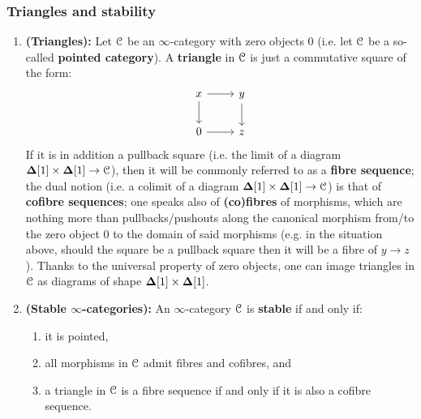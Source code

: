         \subsubsection{Triangles and stability}
            \begin{definition} \label{def: stable_infinity_categories} 
                \noindent
                \begin{enumerate}
                    \item \textbf{(Triangles):} Let $\mathcal{C}$ be an $\infty$-category with zero objects $0$ (i.e. let $\mathcal{C}$ be a so-called \textbf{pointed category}). A \textbf{triangle} in $\mathcal{C}$ is just a commutative square of the form:
                        $$
                            \begin{tikzcd}
                            	x & y \\
                            	0 & z
                            	\arrow[from=1-1, to=2-1]
                            	\arrow[from=1-1, to=1-2]
                            	\arrow[from=1-2, to=2-2]
                            	\arrow[from=2-1, to=2-2]
                            \end{tikzcd}
                        $$
                    If it is in addition a pullback square (i.e. the limit of a diagram $\simp[1] \x \simp[1] \to \C$), then it will be commonly referred to as a \textbf{fibre sequence}; the dual notion (i.e. a colimit of a diagram $\simp[1] \x \simp[1] \to \C$) is that of \textbf{cofibre sequences}; one speaks also of \textbf{(co)fibres} of morphisms, which are nothing more than pullbacks/pushouts along the canonical morphism from/to the zero object $0$ to the domain of said morphisms (e.g. in the situation above, should the square be a pullback square then it will be a fibre of $y \to z$). Thanks to the universal property of zero objects, one can image triangles in $\mathcal{C}$ as diagrams of shape $\simp[1] \x \simp[1]$.
                    \item \textbf{(Stable $\infty$-categories):} An $\infty$-category $\mathcal{C}$ is \textbf{stable} if and only if:
                        \begin{enumerate}
                            \item it is pointed,
                            \item all morphisms in $\mathcal{C}$ admit fibres and cofibres, and
                            \item a triangle in $\mathcal{C}$ is a fibre sequence if and only if it is also a cofibre sequence.
                        \end{enumerate}
                \end{enumerate}
            \end{definition}
